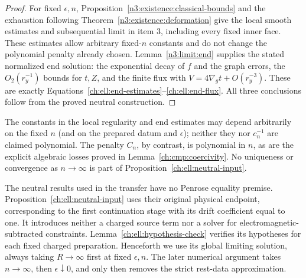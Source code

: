 \begin{proof}
For fixed $\epsilon,n$, Proposition~\ref{n3:existence:classical-bounds}
and the exhaustion following Theorem~\ref{n3:existence:deformation} give
the local smooth estimates and subsequential limit in item \textup{3},
including every fixed inner face. These estimates allow arbitrary
fixed-$n$ constants and do not change the polynomial penalty already
chosen. Lemma~\ref{n3:limit:end} supplies the stated normalized end solution:
the exponential decay of $f$ and the graph errors, the $O_2(r_y^{-1})$
bounds for $t,Z$, and the finite flux with
$V=4\nabla_gt+O(r_y^{-3})$. These are exactly
Equations~\eqref{ch:ell:end-estimates}--\eqref{ch:ell:end-flux}.
All three conclusions follow from the proved neutral construction.
\end{proof}

The constants in the local regularity and end estimates may depend
arbitrarily on the fixed $n$ (and on the prepared datum and
$\epsilon$); neither they nor $c_n^{-1}$ are claimed polynomial.
The penalty $C_n$, by contrast, is polynomial in $n$, as are the
explicit algebraic losses proved in Lemma~\ref{ch:cmp:coercivity}.
No uniqueness or convergence as $n\to\infty$ is part of
Proposition~\ref{ch:ell:neutral-input}.

The neutral results used in the transfer have no Penrose equality premise.
Proposition~\ref{ch:ell:neutral-input} uses their original physical
endpoint, corresponding to the first continuation stage with its
drift coefficient equal to one.  It introduces neither a charged
source term nor a solver for electromagnetic-subtracted constraints.
Lemma~\ref{ch:ell:hypothesis-check} verifies its hypotheses for each
fixed charged preparation.  Henceforth we use its global limiting
solution, always taking $R\to\infty$ first at fixed $\epsilon,n$.
The later numerical argument takes $n\to\infty$, then
$\epsilon\downarrow0$, and only then removes the strict rest-data
approximation.
